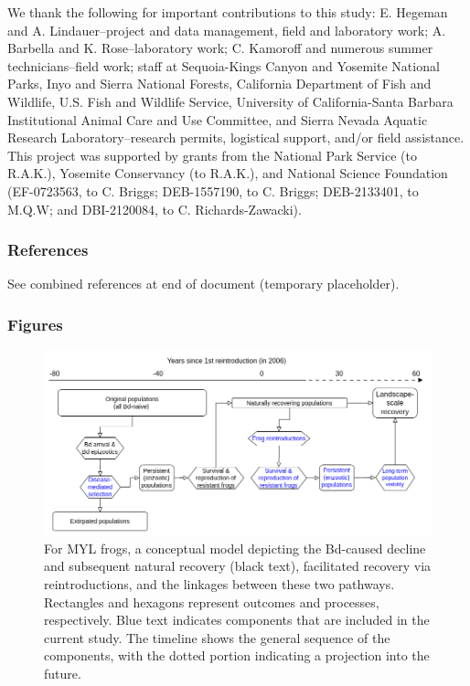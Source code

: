 \documentclass[
  letterpaper,
  DIV=11,
  numbers=noendperiod]{scrartcl}
\begin{document}
We thank the following for important contributions to this study: E.
Hegeman and A. Lindauer--project and data management, field and
laboratory work; A. Barbella and K. Rose--laboratory work; C. Kamoroff
and numerous summer technicians--field work; staff at Sequoia-Kings
Canyon and Yosemite National Parks, Inyo and Sierra National Forests,
California Department of Fish and Wildlife, U.S. Fish and Wildlife
Service, University of California-Santa Barbara Institutional Animal
Care and Use Committee, and Sierra Nevada Aquatic Research
Laboratory--research permits, logistical support, and/or field
assistance. This project was supported by grants from the National Park
Service (to R.A.K.), Yosemite Conservancy (to R.A.K.), and National
Science Foundation (EF-0723563, to C. Briggs; DEB-1557190, to C. Briggs;
DEB-2133401, to M.Q.W; and DBI-2120084, to C. Richards-Zawacki).

\hypertarget{references}{%
\subsubsection{References}\label{references}}

See combined references at end of document (temporary placeholder).

\hfill\break

\hypertarget{figures}{%
\subsubsection{Figures}\label{figures}}

\begin{figure}

{\centering \includegraphics{figures/conceptual_model.png}

}

\caption{\label{fig-recovery-model}For MYL frogs, a conceptual model
depicting the Bd-caused decline and subsequent natural recovery (black
text), facilitated recovery via reintroductions, and the linkages
between these two pathways. Rectangles and hexagons represent outcomes
and processes, respectively. Blue text indicates components that are
included in the current study. The timeline shows the general sequence
of the components, with the dotted portion indicating a projection into
the future.}

\end{figure}
\end{document}
